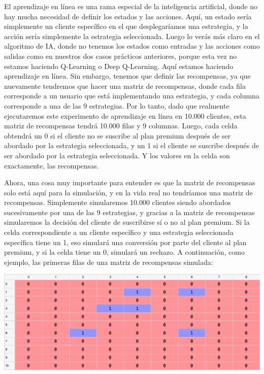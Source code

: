 \documentclass[
]{book}
\begin{document}
El aprendizaje en línea es una rama especial de la inteligencia artificial, donde no hay mucha necesidad de definir los estados y las acciones. Aquí, un estado sería simplemente un cliente específico en el que desplegaríamos una estrategia, y la acción sería simplemente la estrategia seleccionada. Luego lo verás más claro en el algoritmo de IA, donde no tenemos los estados como entradas y las acciones como salidas como en nuestros dos casos prácticos anteriores, porque esta vez no estamos haciendo Q-Learning o Deep Q-Learning. Aquí estamos haciendo aprendizaje en línea. Sin embargo, tenemos que definir las recompensas, ya que nuevamente tendremos que hacer una matriz de recompensas, donde cada fila corresponde a un usuario que está implementando una estrategia, y cada columna corresponde a una de las 9 estrategias. Por lo tanto, dado que realmente ejecutaremos este experimento de aprendizaje en línea en 10.000 clientes, esta matriz de recompensas tendrá 10.000 filas y 9 columnas. Luego, cada celda obtendrá un 0 si el cliente no se suscribe al plan premium después de ser abordado por la estrategia seleccionada, y un 1 si el cliente se suscribe después de ser abordado por la estrategia seleccionada. Y los valores en la celda son exactamente, las recompensas.

Ahora, una cosa muy importante para entender es que la matriz de recompensas solo está aquí para la simulación, y en la vida real no tendríamos una matriz de recompensas. Simplemente simularemos 10.000 clientes siendo abordados sucesivamente por una de las 9 estrategias, y gracias a la matriz de recompensas simularemos la decisión del cliente de suscribirse sí o no al plan premium. Si la celda correspondiente a un cliente específico y una estrategia seleccionada específica tiene un 1, eso simulará una conversión por parte del cliente al plan premium, y si la celda tiene un 0, simulará un rechazo. A continuación, como ejemplo, las primeras filas de una matriz de recompensas simulada:

\includegraphics{Images/Rewards_Matrix.png}
\end{document}
